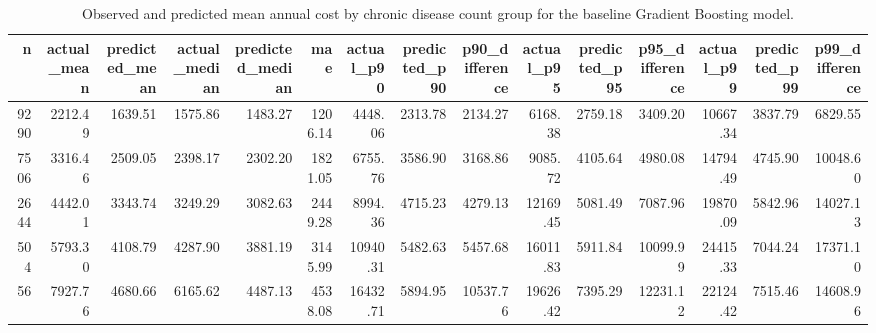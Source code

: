 \begin{table}
\caption{Observed and predicted mean annual cost by chronic disease count group for the baseline Gradient Boosting model.}
\label{tab:05-gb-group-summary-chronic-count}
\begin{tabular}{rrrrrrrrrrrrrrr}
\toprule
n & actual_mean & predicted_mean & actual_median & predicted_median & mae & actual_p90 & predicted_p90 & p90_difference & actual_p95 & predicted_p95 & p95_difference & actual_p99 & predicted_p99 & p99_difference \\
\midrule
9290 & 2212.49 & 1639.51 & 1575.86 & 1483.27 & 1206.14 & 4448.06 & 2313.78 & 2134.27 & 6168.38 & 2759.18 & 3409.20 & 10667.34 & 3837.79 & 6829.55 \\
7506 & 3316.46 & 2509.05 & 2398.17 & 2302.20 & 1821.05 & 6755.76 & 3586.90 & 3168.86 & 9085.72 & 4105.64 & 4980.08 & 14794.49 & 4745.90 & 10048.60 \\
2644 & 4442.01 & 3343.74 & 3249.29 & 3082.63 & 2449.28 & 8994.36 & 4715.23 & 4279.13 & 12169.45 & 5081.49 & 7087.96 & 19870.09 & 5842.96 & 14027.13 \\
504 & 5793.30 & 4108.79 & 4287.90 & 3881.19 & 3145.99 & 10940.31 & 5482.63 & 5457.68 & 16011.83 & 5911.84 & 10099.99 & 24415.33 & 7044.24 & 17371.10 \\
56 & 7927.76 & 4680.66 & 6165.62 & 4487.13 & 4538.08 & 16432.71 & 5894.95 & 10537.76 & 19626.42 & 7395.29 & 12231.12 & 22124.42 & 7515.46 & 14608.96 \\
\bottomrule
\end{tabular}
\end{table}
